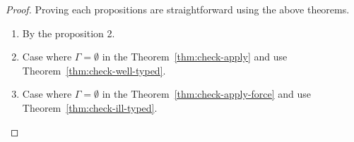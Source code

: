 \documentclass[peerreview, 10pt]{IEEEtran}
\begin{document}
\begin{proof}

Proving each propositions are straightforward using the above theorems.
\begin{enumerate}
    \item By the proposition 2.
    \item Case where $\Gamma=\emptyset$ in the Theorem~\ref{thm:check-apply} and use Theorem~\ref{thm:check-well-typed}.
    \item Case where $\Gamma=\emptyset$ in the Theorem~\ref{thm:check-apply-force} and use Theorem~\ref{thm:check-ill-typed}.
\end{enumerate}
\end{proof}
\end{document}

